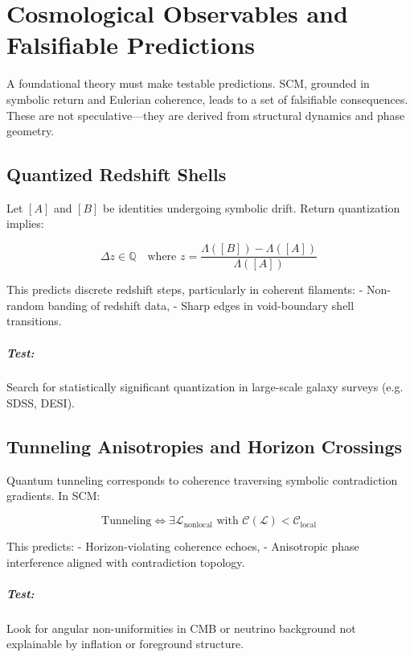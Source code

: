 \chapter{Cosmological Observables and Falsifiable Predictions} \label{chapter:cosmological-predictions}

A foundational theory must make testable predictions. SCM, grounded in symbolic return and Eulerian coherence, leads to a set of falsifiable consequences. These are not speculative—they are derived from structural dynamics and phase geometry.

\section{Quantized Redshift Shells}

Let $[A]$ and $[B]$ be identities undergoing symbolic drift. Return quantization implies:

\[
\Delta z \in \mathbb{Q}
\quad \text{where } z = \frac{\Lambda([B]) - \Lambda([A])}{\Lambda([A])}
\]

This predicts discrete redshift steps, particularly in coherent filaments:
- Non-random banding of redshift data,
- Sharp edges in void-boundary shell transitions.

\paragraph{Test:} Search for statistically significant quantization in large-scale galaxy surveys (e.g. SDSS, DESI).

\section{Tunneling Anisotropies and Horizon Crossings}

Quantum tunneling corresponds to coherence traversing symbolic contradiction gradients. In SCM:

\[
\text{Tunneling} \iff \exists \mathcal{L}_{\text{nonlocal}} \text{ with } \mathcal{C}(\mathcal{L}) < \mathcal{C}_{\text{local}}
\]

This predicts:
- Horizon-violating coherence echoes,
- Anisotropic phase interference aligned with contradiction topology.

\paragraph{Test:} Look for angular non-uniformities in CMB or neutrino background not explainable by inflation or foreground structure.

